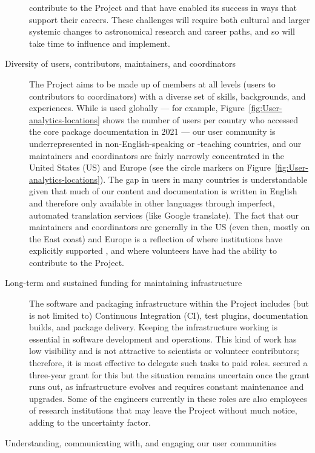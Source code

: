 \documentclass[modern]{aastex631}
\begin{document}
\begin{description}
  contribute to the Project and that have enabled its success in ways that
  support their careers.
  These challenges will require both cultural and larger systemic changes to
  astronomical research and career paths, and so will take time to influence and
  implement.
  \item[Diversity of users, contributors, maintainers, and coordinators]
  The \astropy Project aims to be made up of members at all levels (users to
  contributors to coordinators) with a diverse set of skills, backgrounds, and
  experiences.
  While \astropy is used globally --- for example,
  Figure~\ref{fig:User-analytics-locations} shows the number of users per
  country who accessed the \astropypkg core package documentation in 2021 ---
  our user community is underrepresented in non-English-speaking or -teaching
  countries, and our maintainers and coordinators are fairly narrowly
  concentrated in the United States (US) and Europe (see the circle markers on
  Figure~\ref{fig:User-analytics-locations}).
  The gap in users in many countries is understandable given that much of our
  content and documentation is written in English and therefore only available
  in other languages through imperfect, automated translation services (like
  Google translate).
  The fact that our maintainers and coordinators are generally in the US (even
  then, mostly on the East coast) and Europe is a reflection of where
  institutions have explicitly supported \astropy, and where volunteers have had
  the ability to contribute to the Project.
  \item[Long-term and sustained funding for maintaining infrastructure] The
  software and packaging infrastructure within the \astropy Project includes
  (but is not limited to) Continuous Integration (CI), test plugins,
  documentation builds, and package delivery.
  Keeping the infrastructure working is essential in software development and
  operations.
  This kind of work has low visibility and is not attractive to scientists or
  volunteer contributors; therefore, it is most effective to delegate such tasks
  to paid roles.
  \astropy secured a three-year grant for this but the situation remains
  uncertain once the grant runs out, as infrastructure evolves and requires
  constant maintenance and upgrades.
  Some of the engineers currently in these roles are also employees of research
  institutions that may leave the Project without much notice, adding to the
  uncertainty factor.
  \item[Understanding, communicating with, and engaging our user communities]

\end{description}
\end{document}
